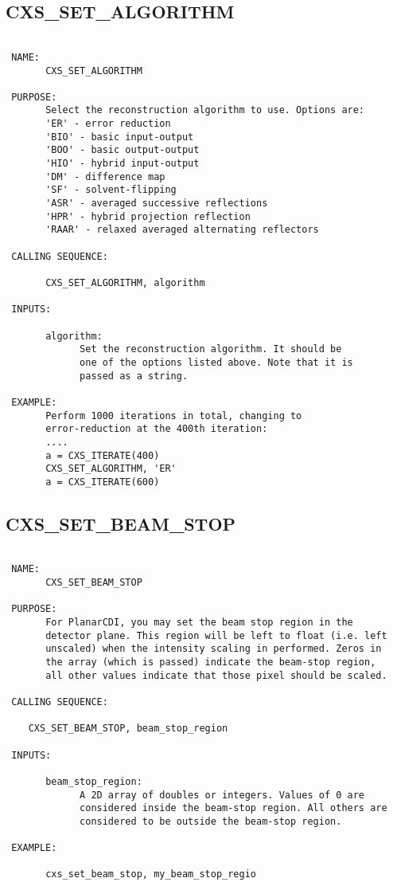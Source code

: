 \subsection{CXS\_SET\_ALGORITHM}
\begin{verbatim}

 NAME:
       CXS_SET_ALGORITHM

 PURPOSE:
       Select the reconstruction algorithm to use. Options are:
       'ER' - error reduction 
       'BIO' - basic input-output 
       'BOO' - basic output-output 
       'HIO' - hybrid input-output 
       'DM' - difference map 
       'SF' - solvent-flipping 
       'ASR' - averaged successive reflections 
       'HPR' - hybrid projection reflection 
       'RAAR' - relaxed averaged alternating reflectors

 CALLING SEQUENCE:

       CXS_SET_ALGORITHM, algorithm

 INPUTS:

       algorithm:
             Set the reconstruction algorithm. It should be
             one of the options listed above. Note that it is
             passed as a string.

 EXAMPLE:
       Perform 1000 iterations in total, changing to 
       error-reduction at the 400th iteration:
       ....
       a = CXS_ITERATE(400)
       CXS_SET_ALGORITHM, 'ER'
       a = CXS_ITERATE(600)

\end{verbatim}






  
 
\subsection{CXS\_SET\_BEAM\_STOP}
\begin{verbatim}

 NAME:
       CXS_SET_BEAM_STOP

 PURPOSE: 
       For PlanarCDI, you may set the beam stop region in the
       detector plane. This region will be left to float (i.e. left
       unscaled) when the intensity scaling in performed. Zeros in
       the array (which is passed) indicate the beam-stop region,
       all other values indicate that those pixel should be scaled.

 CALLING SEQUENCE:

	CXS_SET_BEAM_STOP, beam_stop_region

 INPUTS:

       beam_stop_region: 
             A 2D array of doubles or integers. Values of 0 are
             considered inside the beam-stop region. All others are
             considered to be outside the beam-stop region.

 EXAMPLE:

       cxs_set_beam_stop, my_beam_stop_regio


\end{verbatim}






